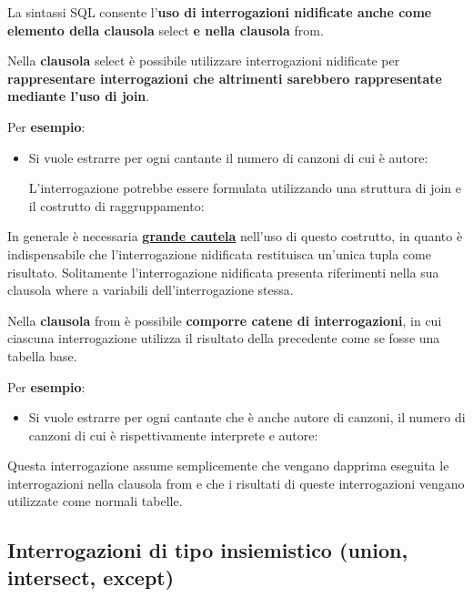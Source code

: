 \documentclass[a4paper]{article}
\begin{document}
	La sintassi SQL consente l'\textbf{uso di interrogazioni nidificate anche come elemento della clausola} \textsf{select} \textbf{e nella clausola} \textsf{from}.\newline
	
	\noindent
	Nella \textbf{clausola} \textcolor{Red3}{\textsf{select}} è possibile utilizzare interrogazioni nidificate per \textbf{rappresentare interrogazioni che altrimenti sarebbero rappresentate mediante l'uso di join}.\newline
	
	\noindent
	Per \textcolor{Green4}{\textbf{esempio}}:
	\begin{itemize}
		\item Si vuole estrarre per ogni cantante il numero di canzoni di cui è autore:
		
		L'interrogazione potrebbe essere formulata utilizzando una struttura di join e il costrutto di raggruppamento:
		
	\end{itemize}
	In generale è necessaria \underline{\textbf{grande cautela}} nell'uso di questo costrutto, in quanto è indispensabile che l'interrogazione nidificata restituisca un'unica tupla come risultato. Solitamente l'interrogazione nidificata presenta riferimenti nella sua clausola \textsf{where} a variabili dell'interrogazione stessa.\newline
	
	\noindent
	Nella \textbf{clausola} \textcolor{Red3}{\textsf{from}} è possibile \textbf{comporre catene di interrogazioni}, in cui ciascuna interrogazione utilizza il risultato della precedente come se fosse una tabella base.\newline
	
	\noindent
	Per \textcolor{Green4}{\textbf{esempio}}:
	\begin{itemize}
		\item Si vuole estrarre per ogni cantante che è anche autore di canzoni, il numero di canzoni di cui è rispettivamente interprete e autore:
		
	\end{itemize}
	Questa interrogazione assume semplicemente che vengano dapprima eseguita le interrogazioni nella clausola \textsf{from} e che i risultati di queste interrogazioni vengano utilizzate come normali tabelle.\newpage
	
	\subsection{Interrogazioni di tipo insiemistico (\textsf{union}, \textsf{intersect}, \textsf{except})}
	
\end{document}
